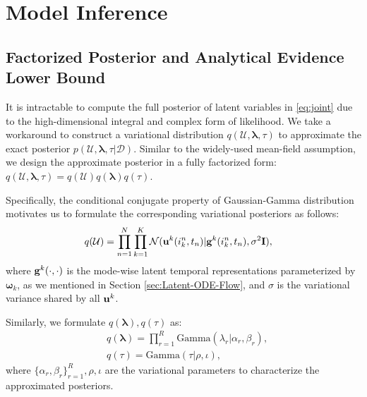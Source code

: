 \section{Model Inference}
\subsection{Factorized Posterior and Analytical Evidence Lower Bound}
It is intractable to compute the full posterior of latent variables in \eqref{eq:joint} due to the high-dimensional integral and complex form of likelihood. We take a workaround to construct a variational distribution $q(\mathcal{U}, \boldsymbol{\lambda}, \tau)$ to approximate the exact posterior $p(\mathcal{U}, \boldsymbol{\lambda}, \tau|\mathcal{D})$. 
Similar to the widely-used mean-field assumption, we  design the approximate posterior in a fully factorized form: $q(\mathcal{U}, \boldsymbol{\lambda}, \tau) = q(\mathcal{U})q(\boldsymbol{\lambda})q(\tau)$.

Specifically, the conditional conjugate property of Gaussian-Gamma distribution motivates us to formulate the corresponding variational posteriors as follows:
\vspace{-2mm}
\begin{equation}
    \begin{split}
        &q(\mathcal{U}) = \prod_{n=1}^{N}\prod_{k=1}^{K} \mathcal{N}(\mathbf{u}^k(i_k^n,t_n)|\mathbf{g}^k(i_k^n,t_n), \sigma^2\mathbf{I}),
        \label{eq:q_u} 
    \end{split}
\end{equation}
where $\mathbf{g}^k(\cdot, \cdot)$  is the mode-wise latent temporal representations parameterized by $\boldsymbol{\omega}_k$, as we mentioned in Section \ref{sec:Latent-ODE-Flow}, and $\sigma$ is the variational variance shared by all $\mathbf{u}^k$.

Similarly, we formulate $q(\boldsymbol{\lambda}), q(\tau)$ as:
\vspace{-2mm}
\begin{align}
        &q(\boldsymbol{\lambda}) =  \prod_{r=1}^{R} \text{Gamma}(\lambda_r|\alpha_r, \beta_r),\label{eq:q_lambda}\\
        &q(\tau) = \text{Gamma}(\tau|\rho, \iota),\label{eq:q_tau}
\end{align}
where $\{\alpha_r, \beta_r\}_{r=1}^{R}, \rho, \iota$ are the variational parameters to characterize the approximated posteriors. 

